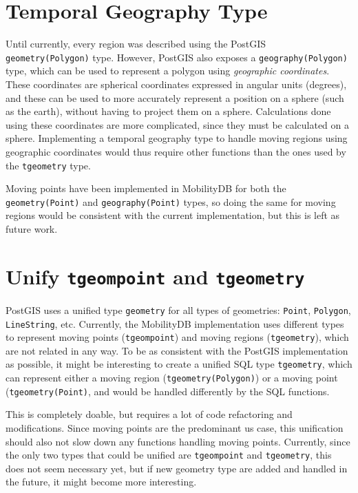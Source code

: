 
\section{Temporal Geography Type}
\label{section:tgeography}

Until currently, every region was described using the PostGIS \lstinline{geometry(Polygon)} type. However, PostGIS also exposes a \lstinline{geography(Polygon)} type, which can be used to represent a polygon using \textit{geographic coordinates}. These coordinates are spherical coordinates expressed in angular units (degrees), and these can be used to more accurately represent a position on a sphere (such as the earth), without having to project them on a sphere. Calculations done using these coordinates are more complicated, since they must be calculated on a sphere. Implementing a temporal geography type to handle moving regions using geographic coordinates would thus require other functions than the ones used by the \lstinline+tgeometry+ type. 

Moving points have been implemented in MobilityDB for both the \lstinline{geometry(Point)} and \lstinline{geography(Point)} types, so doing the same for moving regions would be consistent with the current implementation, but this is left as future work.

\section{Unify \texttt{tgeompoint} and \texttt{tgeometry}}
\label{section:tgeompoint}

PostGIS uses a unified type \lstinline{geometry} for all types of geometries: \lstinline+Point+, \lstinline+Polygon+, \lstinline+LineString+, etc. Currently, the MobilityDB implementation uses different types to represent moving points (\lstinline{tgeompoint}) and moving regions (\lstinline{tgeometry}), which are not related in any way. To be as consistent with the PostGIS implementation as possible, it might be interesting to create a unified SQL type \lstinline{tgeometry}, which can represent either a moving region (\lstinline{tgeometry(Polygon)}) or a moving point (\lstinline{tgeometry(Point)}, and would be handled differently by the SQL functions.

This is completely doable, but requires a lot of code refactoring and modifications. Since moving points are the predominant us case, this unification should also not slow down any functions handling moving points. Currently, since the only two types that could be unified are \lstinline{tgeompoint} and \lstinline{tgeometry}, this does not seem necessary yet, but if new geometry type are added and handled in the future, it might become more interesting.